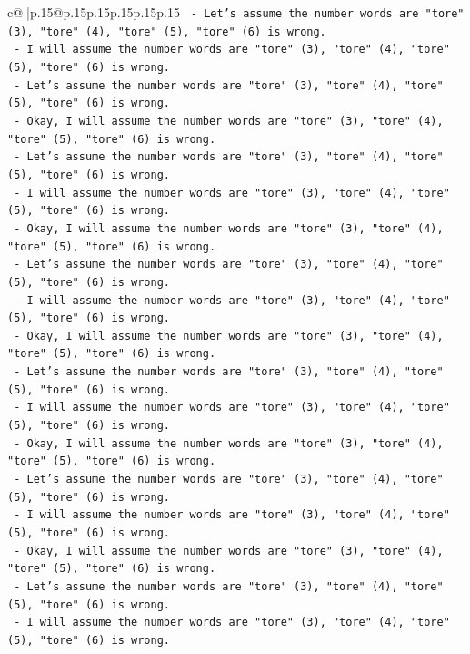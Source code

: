 \documentclass{article}
\begin{document}
{\begin{supertabular}{c@{$\;$}|p{.15\linewidth}@{}p{.15\linewidth}p{.15\linewidth}p{.15\linewidth}p{.15\linewidth}p{.15\linewidth}}
{{{\texttt{  {-} Let's assume the number words are "tore" (3), "tore" (4), "tore" (5), "tore" (6) is wrong.} \\
\texttt{  {-} I will assume the number words are "tore" (3), "tore" (4), "tore" (5), "tore" (6) is wrong.} \\
\texttt{  {-} Let's assume the number words are "tore" (3), "tore" (4), "tore" (5), "tore" (6) is wrong.} \\
\texttt{  {-} Okay, I will assume the number words are "tore" (3), "tore" (4), "tore" (5), "tore" (6) is wrong.} \\
\texttt{  {-} Let's assume the number words are "tore" (3), "tore" (4), "tore" (5), "tore" (6) is wrong.} \\
\texttt{  {-} I will assume the number words are "tore" (3), "tore" (4), "tore" (5), "tore" (6) is wrong.} \\
\texttt{  {-} Okay, I will assume the number words are "tore" (3), "tore" (4), "tore" (5), "tore" (6) is wrong.} \\
\texttt{  {-} Let's assume the number words are "tore" (3), "tore" (4), "tore" (5), "tore" (6) is wrong.} \\
\texttt{  {-} I will assume the number words are "tore" (3), "tore" (4), "tore" (5), "tore" (6) is wrong.} \\
\texttt{  {-} Okay, I will assume the number words are "tore" (3), "tore" (4), "tore" (5), "tore" (6) is wrong.} \\
\texttt{  {-} Let's assume the number words are "tore" (3), "tore" (4), "tore" (5), "tore" (6) is wrong.} \\
\texttt{  {-} I will assume the number words are "tore" (3), "tore" (4), "tore" (5), "tore" (6) is wrong.} \\
\texttt{  {-} Okay, I will assume the number words are "tore" (3), "tore" (4), "tore" (5), "tore" (6) is wrong.} \\
\texttt{  {-} Let's assume the number words are "tore" (3), "tore" (4), "tore" (5), "tore" (6) is wrong.} \\
\texttt{  {-} I will assume the number words are "tore" (3), "tore" (4), "tore" (5), "tore" (6) is wrong.} \\
\texttt{  {-} Okay, I will assume the number words are "tore" (3), "tore" (4), "tore" (5), "tore" (6) is wrong.} \\
\texttt{  {-} Let's assume the number words are "tore" (3), "tore" (4), "tore" (5), "tore" (6) is wrong.} \\
\texttt{  {-} I will assume the number words are "tore" (3), "tore" (4), "tore" (5), "tore" (6) is wrong.} \\
}}}
\end{supertabular}}
\end{document}
